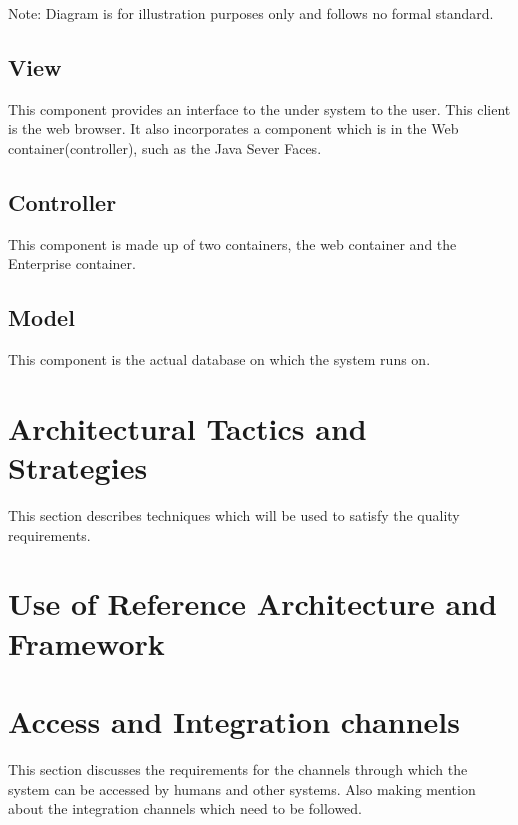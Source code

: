 \documentclass[12pt]{article}
\begin{document}
Note: Diagram is for illustration purposes only and follows no formal standard.

\subsection*{View}
This component provides an interface to the under system to the user. This client is the web browser. It also incorporates a component which is in the Web container(controller), such as the Java Sever Faces. 
\subsection*{Controller}
This component is made up of two containers, the web container and the Enterprise container.
\subsection*{Model}
This component is the actual database on which the system runs on.
\section{Architectural Tactics and Strategies} %
This section describes techniques which will be used to satisfy the quality requirements. 

\section{Use of Reference Architecture and Framework}

\section{Access and Integration channels}
This section discusses the requirements for the channels through which the system can be accessed by humans and other systems. Also making mention about the integration channels which need to be followed. 
\end{document}

